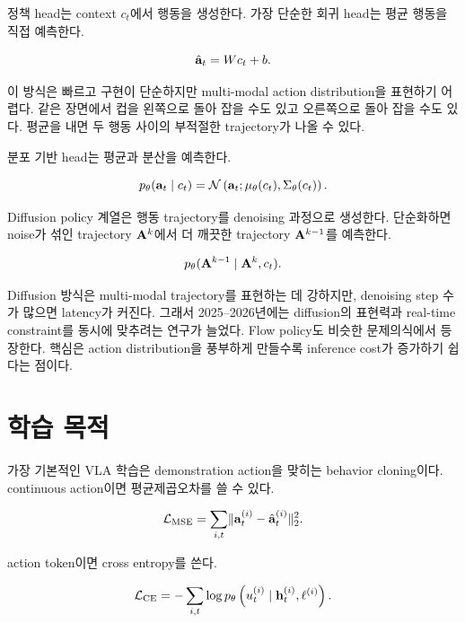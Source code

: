 정책 head는 context $c_t$에서 행동을 생성한다. 가장 단순한 회귀 head는 평균 행동을 직접 예측한다.

\begin{equation}
  \hat{\mathbf{a}}_t = W c_t + b.
  \label{eq:regression_head}
\end{equation}

이 방식은 빠르고 구현이 단순하지만 multi-modal action distribution을 표현하기 어렵다. 같은 장면에서 컵을 왼쪽으로 돌아 잡을 수도 있고 오른쪽으로 돌아 잡을 수도 있다. 평균을 내면 두 행동 사이의 부적절한 trajectory가 나올 수 있다.

분포 기반 head는 평균과 분산을 예측한다.

\begin{equation}
  p_\theta(\mathbf{a}_t \mid c_t)
  =
  \mathcal{N}
  \left(
    \mathbf{a}_t;
    \mu_\theta(c_t),
    \Sigma_\theta(c_t)
  \right).
  \label{eq:gaussian_policy}
\end{equation}

Diffusion policy 계열은 행동 trajectory를 denoising 과정으로 생성한다. 단순화하면 noise가 섞인 trajectory $\mathbf{A}^k$에서 더 깨끗한 trajectory $\mathbf{A}^{k-1}$를 예측한다.

\begin{equation}
  p_\theta(\mathbf{A}^{k-1} \mid \mathbf{A}^k, c_t).
  \label{eq:diffusion_step}
\end{equation}

Diffusion 방식은 multi-modal trajectory를 표현하는 데 강하지만, denoising step 수가 많으면 latency가 커진다. 그래서 2025--2026년에는 diffusion의 표현력과 real-time constraint를 동시에 맞추려는 연구가 늘었다. Flow policy도 비슷한 문제의식에서 등장한다. 핵심은 action distribution을 풍부하게 만들수록 inference cost가 증가하기 쉽다는 점이다.

\section{학습 목적}

가장 기본적인 VLA 학습은 demonstration action을 맞히는 behavior cloning이다. continuous action이면 평균제곱오차를 쓸 수 있다.

\begin{equation}
  \mathcal{L}_{\mathrm{MSE}}
  =
  \sum_{i,t}
  \lVert
    \mathbf{a}_{t}^{(i)}
    -
    \hat{\mathbf{a}}_{t}^{(i)}
  \rVert_2^2.
  \label{eq:mse_action}
\end{equation}

action token이면 cross entropy를 쓴다.

\begin{equation}
  \mathcal{L}_{\mathrm{CE}}
  =
  - \sum_{i,t}
  \log
  p_\theta
  \left(
    u_t^{(i)}
    \mid
    \mathbf{h}_t^{(i)}, \ell^{(i)}
  \right).
  \label{eq:ce_action}
\end{equation}

